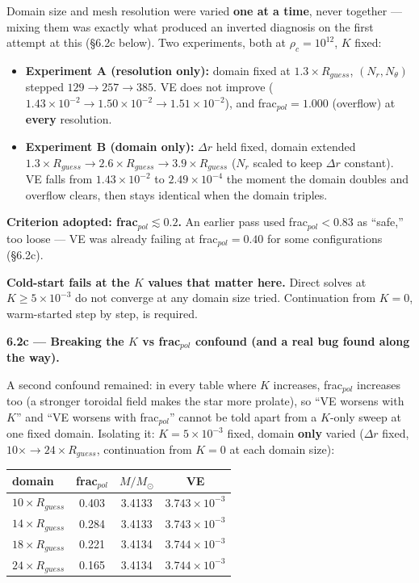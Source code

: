 \documentclass[11pt,a4paper]{scrartcl}
\begin{document}
Domain size and mesh resolution were varied \textbf{one at a time},
never together --- mixing them was exactly what produced an inverted
diagnosis on the first attempt at this (\S6.2c below). Two experiments,
both at $\rho_c=10^{12}$, $K$ fixed:

\begin{itemize}[leftmargin=1.4em,itemsep=0.2em]
\item \textbf{Experiment A (resolution only):} domain fixed at
  $1.3\times R_{guess}$, $(N_r,N_\theta)$ stepped $129\to257\to385$.
  VE does not improve ($1.43\times10^{-2}\to1.50\times10^{-2}
  \to1.51\times10^{-2}$), and frac$_{pol}=1.000$ (overflow) at
  \textbf{every} resolution.
\item \textbf{Experiment B (domain only):} $\Delta r$ held fixed,
  domain extended $1.3\times R_{guess}\to2.6\times R_{guess}
  \to3.9\times R_{guess}$ ($N_r$ scaled to keep $\Delta r$ constant).
  VE falls from $1.43\times10^{-2}$ to $2.49\times10^{-4}$ the moment
  the domain doubles and overflow clears, then stays identical when the
  domain triples.
\end{itemize}

\textbf{Criterion adopted: frac$_{pol}\lesssim0.2$.} An earlier pass
used frac$_{pol}<0.83$ as ``safe,'' too loose --- VE was already
failing at frac$_{pol}=0.40$ for some configurations (\S6.2c).

\textbf{Cold-start fails at the $K$ values that matter here.} Direct
solves at $K\ge5\times10^{-3}$ do not converge at any domain size
tried. Continuation from $K=0$, warm-started step by step, is required.

\medskip\noindent\textbf{6.2c --- Breaking the $K$ vs frac$_{pol}$ confound (and a real bug found along the way).}

A second confound remained: in every table where $K$ increases,
frac$_{pol}$ increases too (a stronger toroidal field makes the star
more prolate), so ``VE worsens with $K$'' and ``VE worsens with
frac$_{pol}$'' cannot be told apart from a $K$-only sweep at one fixed
domain. Isolating it: $K=5\times10^{-3}$ fixed, domain \textbf{only}
varied ($\Delta r$ fixed, $10\times\to24\times R_{guess}$, continuation
from $K=0$ at each domain size):

\begin{center}
\begin{tabular}{@{}lccc@{}}
\toprule
domain & frac$_{pol}$ & $M/M_\odot$ & VE\\
\midrule
$10\times R_{guess}$ & 0.403 & 3.4133 & $3.743\times10^{-3}$\\
$14\times R_{guess}$ & 0.284 & 3.4133 & $3.743\times10^{-3}$\\
$18\times R_{guess}$ & 0.221 & 3.4134 & $3.744\times10^{-3}$\\
$24\times R_{guess}$ & 0.165 & 3.4134 & $3.744\times10^{-3}$\\
\bottomrule
\end{tabular}
\end{center}
\end{document}
